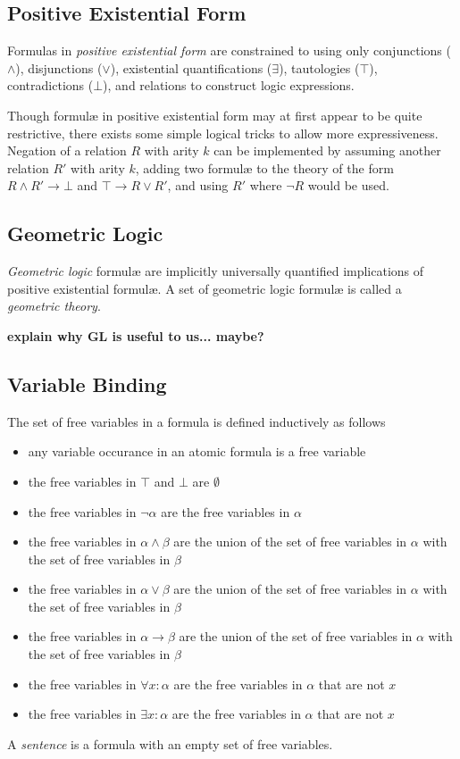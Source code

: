 	\subsection{Positive Existential Form}

		Formulas in \emph{positive existential form} are constrained to using
		only conjunctions ($\wedge$), disjunctions ($\vee$), existential
		quantifications ($\exists$), tautologies ($\top$), contradictions
		($\bot$), and relations to construct logic expressions.

		Though formul{\ae} in positive existential form may at first appear to
		be quite restrictive, there exists some simple logical tricks to allow
		more expressiveness. Negation of a relation $R$ with arity $k$ can be
		implemented by assuming another relation $R'$ with arity $k$, adding
		two formul{\ae} to the theory of the form $R \wedge R' \to \bot$ and
		$\top \to R \vee R'$, and using $R'$ where $\neg R$ would be used.

	\subsection{Geometric Logic}

		\emph{Geometric logic} formul{\ae} are implicitly universally
		quantified implications of positive existential formul{\ae}. A set of
		geometric logic formul{\ae} is called a \emph{geometric theory}.

		\textbf{explain why GL is useful to us... maybe?}

	\subsection{Variable Binding}

		The set of free variables in a formula is defined inductively as follows
		\begin{itemize}
		\item any variable occurance in an atomic formula is a free variable
		\item the free variables in $\top$ and $\bot$ are $\emptyset$
		\item the free variables in $\neg\alpha$ are the free variables in $\alpha$
		\item the free variables in $\alpha \wedge \beta$ are the union of the set of free variables in $\alpha$ with the set of free variables in $\beta$
		\item the free variables in $\alpha \vee   \beta$ are the union of the set of free variables in $\alpha$ with the set of free variables in $\beta$
		\item the free variables in $\alpha \to    \beta$ are the union of the set of free variables in $\alpha$ with the set of free variables in $\beta$
		\item the free variables in $\forall x : \alpha$ are the free variables in $\alpha$ that are not $x$
		\item the free variables in $\exists x : \alpha$ are the free variables in $\alpha$ that are not $x$
		\end{itemize}
		A \emph{sentence} is a formula with an empty set of free variables.

